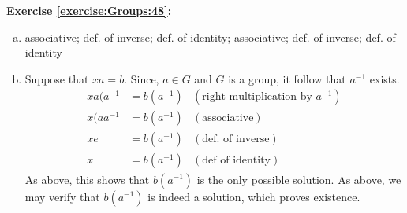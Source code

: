 \noindent\textbf{Exercise \ref{exercise:Groups:48}:} 
\begin{enumerate}[(a)]
\item 
%
%
% 
%
%
associative;  	def. of inverse;  def. of identity; associative; def. of inverse; def. of identity
\item
Suppose that $xa = b$. Since, $a \in G$ and $G$ is a group, it follow that $a^{-1}$ exists.\\
\begin{align*}
xa(a^{-1} &= b(a^{-1})	& (\text{right multiplication by $a^{-1}$})\\
x(aa^{-1} &= b(a^{-1})	& (\text{associative})\\
xe &= b(a^{-1})	& (\text{def. of inverse})\\
x &= b(a^{-1})	& (\text{def of identity})
\end{align*}
As above, this shows that $b (a^{-1})$ is the only possible solution. As above, we may verify that $b (a^{-1})$ is indeed a solution, which proves existence.
\end{enumerate}

